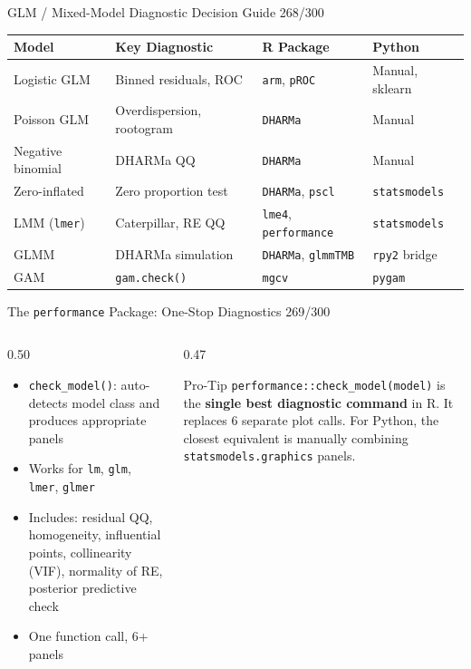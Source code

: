 \documentclass[10pt]{beamer}
\newcommand{\smark}[1]{\hfill{\scriptsize\color{codegray}#1}}
\begin{document}
\begin{frame}{GLM / Mixed-Model Diagnostic Decision Guide}
\smark{268/300}
\centering\small
\begin{tabular}{@{}llll@{}}
    \toprule
    \textbf{Model} & \textbf{Key Diagnostic} & \textbf{R Package} & \textbf{Python} \\
    \midrule
    Logistic GLM     & Binned residuals, ROC    & \texttt{arm}, \texttt{pROC}      & Manual, sklearn \\
    Poisson GLM      & Overdispersion, rootogram & \texttt{DHARMa}               & Manual \\
    Negative binomial& DHARMa QQ                 & \texttt{DHARMa}               & Manual \\
    Zero-inflated    & Zero proportion test       & \texttt{DHARMa}, \texttt{pscl} & \texttt{statsmodels} \\
    LMM (\texttt{lmer}) & Caterpillar, RE QQ     & \texttt{lme4}, \texttt{performance} & \texttt{statsmodels} \\
    GLMM             & DHARMa simulation          & \texttt{DHARMa}, \texttt{glmmTMB}  & \texttt{rpy2} bridge \\
    GAM              & \texttt{gam.check()}       & \texttt{mgcv}                  & \texttt{pygam} \\
    \bottomrule
\end{tabular}
\end{frame}

\begin{frame}{The \texttt{performance} Package: One-Stop Diagnostics}
\smark{269/300}
\begin{columns}[T]
\begin{column}{0.50\textwidth}
\begin{itemize}
    \item \texttt{check\_model()}: auto-detects model class and produces appropriate panels
    \item Works for \texttt{lm}, \texttt{glm}, \texttt{lmer}, \texttt{glmer}
    \item Includes: residual QQ, homogeneity, influential points, collinearity (VIF), normality of RE, posterior predictive check
    \item One function call, 6+ panels
\end{itemize}
\end{column}
\begin{column}{0.47\textwidth}
\begin{alertblock}{Pro-Tip}
    \scriptsize \texttt{performance::check\_model(model)} is the \textbf{single best diagnostic command} in R. It replaces 6 separate plot calls. For Python, the closest equivalent is manually combining \texttt{statsmodels.graphics} panels.
\end{alertblock}
\end{column}
\end{columns}
\end{frame}
\end{document}
